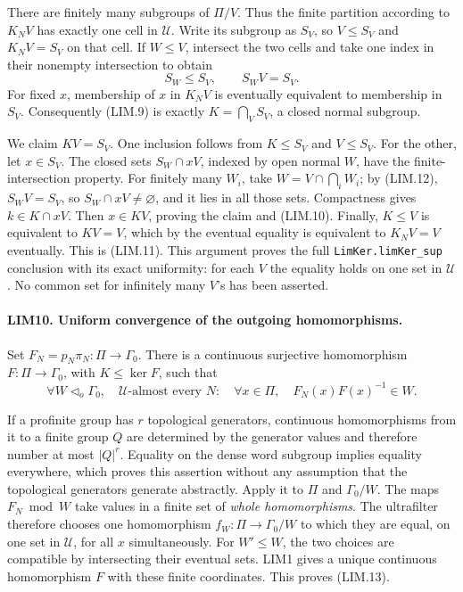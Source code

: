 There are finitely many subgroups of \(\Pi/V\).  Thus the finite
partition according to \(K_NV\) has exactly one cell in \(\mathcal U\).
Write its subgroup as \(S_V\), so \(V\le S_V\) and
\(K_NV=S_V\) on that cell.  If \(W\le V\), intersect the two
cells and take one index in their nonempty intersection to obtain
\[
 S_W\le S_V,\qquad S_WV=S_V.
 \tag{LIM.12}
\]
For fixed \(x\), membership of \(x\) in \(K_NV\) is eventually
equivalent to membership in \(S_V\).  Consequently (LIM.9) is exactly
\(K=\bigcap_V S_V\), a closed normal subgroup.

We claim \(KV=S_V\).  One inclusion follows from \(K\le S_V\)
and \(V\le S_V\).  For the other, let \(x\in S_V\).
The closed sets \(S_W\cap xV\), indexed by open normal \(W\),
have the finite-intersection property.  For finitely many \(W_i\),
take \(W=V\cap\bigcap_iW_i\); by (LIM.12),
\(S_WV=S_V\), so \(S_W\cap xV\ne\varnothing\), and it lies
in all those sets.  Compactness gives \(k\in K\cap xV\).
Then \(x\in KV\), proving the claim and (LIM.10).
Finally, \(K\le V\) is equivalent to \(KV=V\), which by the
eventual equality is equivalent to \(K_NV=V\) eventually.
This is (LIM.11).  This argument proves the full
\texttt{LimKer.limKer\_sup} conclusion with its exact uniformity:
for each \(V\) the equality holds on one set in \(\mathcal U\).
No common set for infinitely many \(V\)'s has been asserted.

\paragraph{LIM10. Uniform convergence of the outgoing homomorphisms.}
\label{claim:LIM10}
Set \(F_N=p_N\pi_N:\Pi\to\Gamma_0\).
There is a continuous surjective homomorphism
\(F:\Pi\to\Gamma_0\), with \(K\le\ker F\), such that
\[
 \forall W\triangleleft_o\Gamma_0,\quad
 \mathcal U\text{-almost every }N:\quad
 \forall x\in\Pi,\quad F_N(x)F(x)^{-1}\in W.
 \tag{LIM.13}
\]

If a profinite group has \(r\) topological generators, continuous
homomorphisms from it to a finite group \(Q\) are determined by
the generator values and therefore number at most \(|Q|^r\).
Equality on the dense word subgroup implies equality everywhere,
which proves this assertion without any assumption that the
topological generators generate abstractly.
Apply it to \(\Pi\) and \(\Gamma_0/W\).
The maps \(F_N\bmod W\) take values in a finite set of
\emph{whole homomorphisms}.  The ultrafilter therefore chooses one
homomorphism \(f_W:\Pi\to\Gamma_0/W\) to which they are equal,
on one set in \(\mathcal U\), for all \(x\) simultaneously.
For \(W'\le W\), the two choices are compatible by intersecting
their eventual sets.  LIM1 gives a unique continuous homomorphism
\(F\) with these finite coordinates.  This proves (LIM.13).


